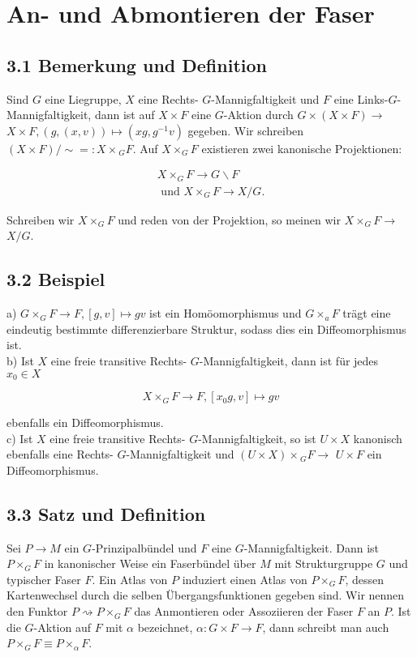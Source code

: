 \pagebreak

\section{An- und Abmontieren der Faser}

\subsection*{3.1 Bemerkung und Definition}
Sind $G$ eine Liegruppe, $X$ eine Rechts- $G$-Mannigfaltigkeit und $F$ eine Links-$G$-Mannigfaltigkeit, dann ist auf $X \times F$ eine $G$-Aktion durch $G \times(X \times F) \rightarrow$ $X \times F,(g,(x, v)) \mapsto\left(x g, g^{-1} v\right)$ gegeben. Wir schreiben $(X \times F) / \sim=: X \times{ }_{G} F$. Auf $X \times_{G} F$ existieren zwei kanonische Projektionen:

$$
\begin{gathered}
X \times_{G} F \rightarrow G \backslash F \\
\text { und } X \times_{G} F \rightarrow X / G .
\end{gathered}
$$

Schreiben wir $X \times_{G} F$ und reden von der Projektion, so meinen wir $X \times_{G} F \rightarrow$ $X / G$.

\subsection*{3.2 Beispiel}
a) $G \times_{G} F \rightarrow F,[g, v] \mapsto g v$ ist ein Homöomorphismus und $G \times_{a} F$ trägt eine eindeutig bestimmte differenzierbare Struktur, sodass dies ein Diffeomorphismus ist.\\
b) Ist $X$ eine freie transitive Rechts- $G$-Mannigfaltigkeit, dann ist für jedes $x_{0} \in X$

$$
X \times_{G} F \rightarrow F,\left[x_{0} g, v\right] \mapsto g v
$$

ebenfalls ein Diffeomorphismus.\\
c) Ist $X$ eine freie transitive Rechts- $G$-Mannigfaltigkeit, so ist $U \times X$ kanonisch ebenfalls eine Rechts- $G$-Mannigfaltigkeit und $(U \times X) \times{ }_{G} F \rightarrow$ $U \times F$ ein Diffeomorphismus.

\subsection*{3.3 Satz und Definition}
Sei $P \rightarrow M$ ein $G$-Prinzipalbündel und $F$ eine $G$-Mannigfaltigkeit. Dann ist $P \times_{G} F$ in kanonischer Weise ein Faserbündel über $M$ mit Strukturgruppe $G$ und typischer Faser $F$. Ein Atlas von $P$ induziert einen Atlas von $P \times_{G} F$, dessen Kartenwechsel durch die selben Übergangsfunktionen gegeben sind. Wir nennen den Funktor $P \rightsquigarrow P \times_{G} F$ das Anmontieren oder Assoziieren der Faser $F$ an $P$. Ist die $G$-Aktion auf $F$ mit $\alpha$ bezeichnet, $\alpha: G \times F \rightarrow F$, dann schreibt man auch $P \times_{G} F \equiv P \times_{\alpha} F$.

